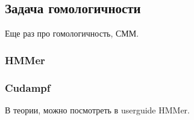 \subsection{Задача гомологичности}
Еще раз про гомологичность, СММ.
\subsubsection{HMMer}
\subsubsection{Cudampf}

В теории, можно посмотреть в userguide HMMer.
